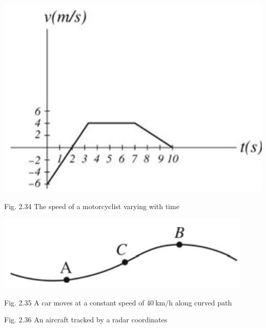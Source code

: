 \documentclass[10pt]{article}
\begin{document}
\begin{center}
\includegraphics[max width=\textwidth]{2024_09_13_db1f357d2aad0a03eb2eg-045}
\end{center}

Fig. 2.34 The speed of a motorcyclist varying with time

\begin{center}
\includegraphics[max width=\textwidth]{2024_09_13_db1f357d2aad0a03eb2eg-045(2)}
\end{center}

Fig. 2.35 A car moves at a constant speed of $40 \mathrm{~km} / \mathrm{h}$ along curved path

Fig. 2.36 An aircraft tracked by a radar coordinates
\end{document}
